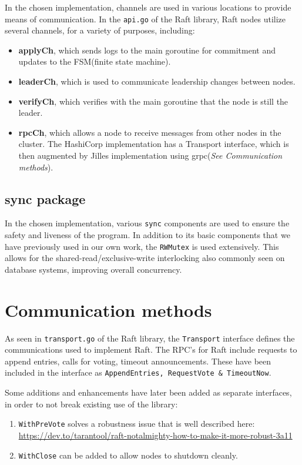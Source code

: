 \documentclass[a4paper,11pt]{article}
\begin{document}
\bigbreak \noindent In the chosen implementation, channels are used in various locations to provide means of communication. In the \texttt{api.go} of the Raft library, Raft nodes utilize several channels, for a variety of purposes, including:
\begin{itemize}
    \item \textbf{applyCh}, which sends logs to the main goroutine for commitment and updates to the FSM(finite state machine).
    \item \textbf{leaderCh}, which is used to communicate leadership changes between nodes.
    \item \textbf{verifyCh}, which verifies with the main goroutine that the node is still the leader.
    \item \textbf{rpcCh}, which allows a node to receive messages from other nodes in the cluster. The HashiCorp implementation has a Transport interface, which is then augmented by Jilles implementation using grpc(\textit{See Communication methods}).
\end{itemize}
\subsection{sync package} %
In the chosen implementation, various \texttt{sync} components are used to ensure the safety and liveness of the program. In addition to its basic components that we have previously used in our own work, the \texttt{RWMutex} is used extensively. This allows for the shared-read/exclusive-write interlocking also commonly seen on database systems, improving overall concurrency. 
\section{Communication methods}

As seen in \texttt{transport.go} of the Raft library, the \texttt{Transport} interface defines the communications used to implement Raft. The RPC's for Raft include requests to append entries, calls for voting, timeout announcements. These have been included in the interface as \texttt{AppendEntries, RequestVote \& TimeoutNow}. 


\bigbreak
\noindent Some additions and enhancements have later been added as separate interfaces, in order to not break existing use of the library:

\begin{enumerate}
    \item \texttt{WithPreVote} solves a robustness issue that is well described here: \url{https://dev.to/tarantool/raft-notalmighty-how-to-make-it-more-robust-3a11}
    \item \texttt{WithClose} can be added to allow nodes to shutdown cleanly.
\end{enumerate}
\end{document}
